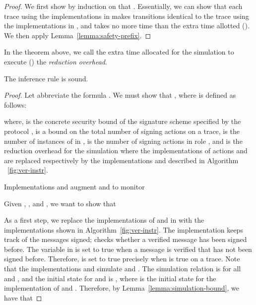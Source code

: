 \begin{proof}
  We first show by induction on   that . Essentially, we can show
that
each trace using the implementations in  makes
transitions identical to the
  trace using the implementations in , and
takes no more time than the extra time allotted ().
We then apply Lemma~\ref{lemma:safety-prefix}.
\end{proof}

In the theorem above, we call the extra time allocated for
the simulation to execute
() the \emph{reduction overhead}.



\begin{lemma} The inference rule  is sound. \end{lemma}


\begin{proof}
Let  abbreviate the formula .
We must show that  \mbox{}, where 
  is defined as
follows:

where,  is the concrete security bound of the signature
scheme  specified by the protocol ,  is a bound on the total number of signing actions on a trace,  is
the number of instances of  in ,  is the number of signing
actions in role , and  is the reduction overhead
for the simulation where the implementations of actions  and
 are replaced respectively by the implementations  and 
described in Algorithm ~\ref{fig:ver-instr}.

  \begin{algorithm2e}
    \myalg{\isign{}}{
      \nl  \sign{}\;
      \nl \KwRet{}\;}{}
    \setcounter{AlgoLine}{0}
    \myalg{\iverify{}}{
      \nl  \verify{}\;
      \nl\;
      \nl \KwRet{}\;}{}
  \caption{Implementations  and  augment  and  to monitor }
  \label{fig:ver-instr}
  \end{algorithm2e}


Given , , and , we want to show that

As a first step, we replace the implementations of  and
 in  with
the implementations shown in Algorithm~\ref{fig:ver-instr}.
The implementation  keeps track of the messages signed;
 checks whether a verified message has been signed before. The
variable  in  is set to true when a message is verified
that has not been signed before. Therefore,  is set to true precisely when
 is true on a trace.  Note that the
implementations  and  simulate  and
. The simulation relation is  for all
 and , and the initial state for  and 
is , where  is the initial state for the
implementation of  and . Therefore, by
Lemma~\ref{lemma:simulation-bound}, we have that


\end{proof}
